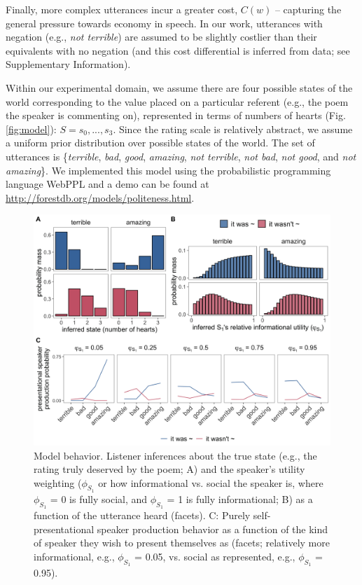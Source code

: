 \documentclass[9pt,twocolumn,twoside,lineno]{main_class_file}
\begin{document}
Finally, more complex utterances incur a greater cost, \(C(w)\) --
capturing the general pressure towards economy in speech. In our work,
utterances with negation (e.g., \emph{not terrible}) are assumed to
be slightly costlier than their equivalents with no negation (and this cost differential is inferred
from data; see Supplementary Information).

Within our experimental domain, we assume there are four possible states
of the world corresponding to the value placed on a particular referent
(e.g., the poem the speaker is commenting on), represented in terms of numbers of hearts (Fig. \ref{fig:model}):
\(S = {s_0,...,s_3}\). Since the rating scale is relatively abstract, we assume a uniform prior distribution
over possible states of the world. The set of utterances is
\{\emph{terrible}, \emph{bad}, \emph{good}, \emph{amazing}, \emph{not
terrible}, \emph{not bad}, \emph{not good}, and \emph{not amazing}\}. We
implemented this model using the probabilistic programming language
WebPPL \cite{dippl} and a demo can be found at \url{http://forestdb.org/models/politeness.html}.

\begin{figure}[!h]
\includegraphics[width=\columnwidth]{fig/L1_inferences_wS2pres} \centering \caption{Model behavior. Listener inferences about the true state (e.g., the rating truly deserved by the poem; A) and the speaker's utility weighting ($\phi_{S_1}$ or how informational vs. social the speaker is, where $\phi_{S_1}$ = 0 is fully social, and $\phi_{S_1}$ = 1 is fully informational; B) as a function of the utterance heard (facets). C: Purely self-presentational speaker production behavior as a function of the kind of speaker they wish to present themselves as (facets; relatively more informational, e.g., $\phi_{S_1}$ = 0.05, vs. social as represented, e.g., $\phi_{S_1}$ = 0.95).}\label{fig:L1inferences}
\end{figure}
\end{document}
